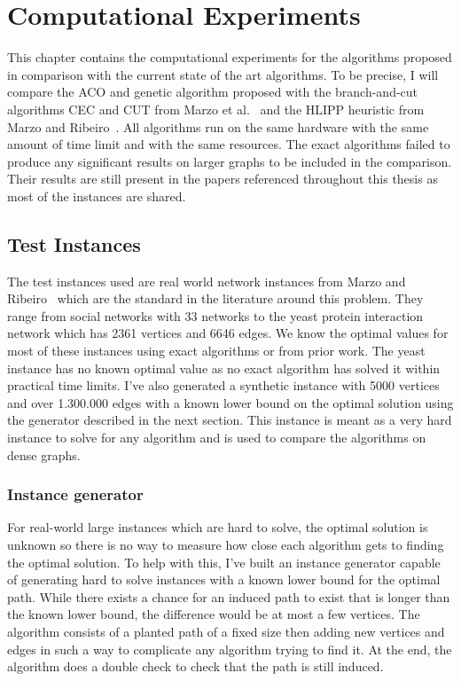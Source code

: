 \chapter{Computational Experiments}\label{chapter3}

This chapter contains the computational experiments for the algorithms proposed in comparison with the current state of the art algorithms. To be precise, I will compare the ACO and genetic algorithm proposed with the branch-and-cut algorithms CEC and CUT from Marzo et al.~\cite{marzo2} and the HLIPP heuristic from Marzo and Ribeiro~\cite{marzo}. All algorithms run on the same hardware with the same amount of time limit and with the same resources. The exact algorithms failed to produce any significant results on larger graphs to be included in the comparison. Their results are still present in the papers referenced throughout this thesis as most of the instances are shared.

\section{Test Instances}\label{sec:instances}

The test instances used are real world network instances from Marzo and Ribeiro~\cite{marzo} which are the standard in the literature around this problem. They range from social networks with 33 networks to the yeast protein interaction network which has 2361 vertices and 6646 edges. We know the optimal values for most of these instances using exact algorithms or from prior work. The yeast instance has no known optimal value as no exact algorithm has solved it within practical time limits. I've also generated a synthetic instance with 5000 vertices and over 1.300.000 edges with a known lower bound on the optimal solution using the generator described in the next section. This instance is meant as a very hard instance to solve for any algorithm and is used to compare the algorithms on dense graphs.

\subsection{Instance generator}\label{sec:generator}

For real-world large instances which are hard to solve, the optimal solution is unknown so there is no way to measure how close each algorithm gets to finding the optimal solution. To help with this, I've built an instance generator capable of generating hard to solve instances with a known lower bound for the optimal path. While there exists a chance for an induced path to exist that is longer than the known lower bound, the difference would be at most a few vertices. The algorithm consists of a planted path of a fixed size then adding new vertices and edges in such a way to complicate any algorithm trying to find it. At the end, the algorithm does a double check to check that the path is still induced.

